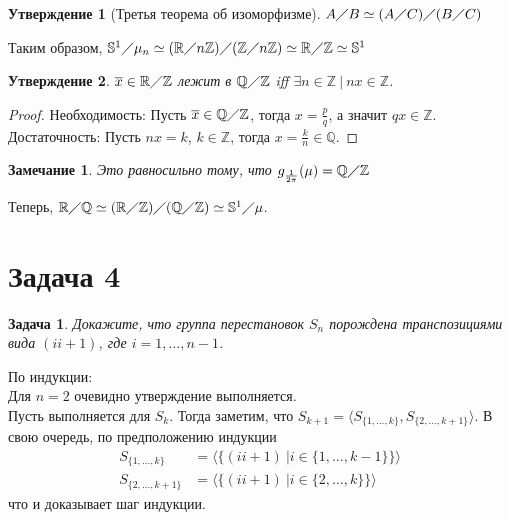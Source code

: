 \documentclass{article}
\newtheorem{task}{Задача}
\newtheorem{statement}{Утверждение}
\newtheorem{remark}{Замечание}
\newcommand{\gen}[1]{\langle #1 \rangle}
\newcommand{\srange}[2]{\{#1, \dots, #2\}}
\newcommand{\range}[2]{#1, \dots, #2}
\newcommand{\isomorphic}{\simeq}
\newcommand{\sphere}[1]{\mathbb{S}^{#1}}
\newcommand{\quotient}[2]{#1 \diagup #2}
\newcommand{\R}{\mathbb{R}}
\newcommand{\Q}{\mathbb{Q}}
\newcommand{\Z}{\mathbb{Z}}
\newcommand{\Zn}[1]{\quotient{\Z}{#1\Z}}
\newcommand{\class}[1]{\overline{#1}}
\begin{document}
\begin{statement}[Третья теорема об изоморфизме]
$\quotient{A}{B} \isomorphic \quotient{(\quotient{A}{C})}{(\quotient{B}{C})}$
\end{statement}



Таким образом, 
\begin{math}
    \quotient{\sphere{1}}{\mu_n}                \isomorphic 
    \quotient{(\quotient{\R}{n\Z})}{(\Zn{n})}   \isomorphic 
    \quotient{\R}{\Z}                           \isomorphic 
    \sphere{1}
\end{math}

\begin{statement}
$\class{x} \in \quotient{\R}{\Z}$ лежит в $\quotient{\Q}{\Z}$ iff $\exists n \in \Z ~ | ~ n x \in \Z$. 
\end{statement}

\begin{proof}
    Необходимость: 
    Пусть $\class{x} \in \quotient{\Q}{\Z}$, тогда $x = \frac{p}{q}$, а значит $q x \in \Z$.
    Достаточность:
    Пусть $n x = k$, $k \in \Z$, тогда $x = \frac{k}{n} \in \Q$.
\end{proof}

\begin{remark}
Это равносильно тому, что $g_{\frac{1}{2 \pi}} (\mu) = \quotient{\Q}{\Z}$
\end{remark}

Теперь, 
\begin{math}
    \quotient{\R}{\Q} \isomorphic
    \quotient{(\quotient{\R}{\Z})}{(\quotient{\Q}{\Z})} \isomorphic
    \quotient{\sphere{1}}{\mu}
\end{math}.

\section*{Задача 4}

\begin{task}
Докажите, что группа перестановок $S_n$ порождена транспозициями вида $(i i + 1)$, где $i = \range{1}{n - 1}$.
\end{task}

По индукции: \\ 

Для $n = 2$ очевидно утверждение выполняется.\\

Пусть выполняется для $S_k$. 
Тогда заметим, что $S_{k + 1} = \gen{S_{\srange{1}{k}}, S_{\srange{2}{k + 1}}}$.
В свою очередь, по предположению индукции 
\begin{align*}
    S_{\srange{1}{k}} &= \gen{\{(i i + 1) ~ | i \in \srange{1}{k - 1}\}} \\
    S_{\srange{2}{k + 1}} &= \gen{\{(i i + 1) ~ | i \in \srange{2}{k}\}}
\end{align*}
что и доказывает шаг индукции.
\end{document}

